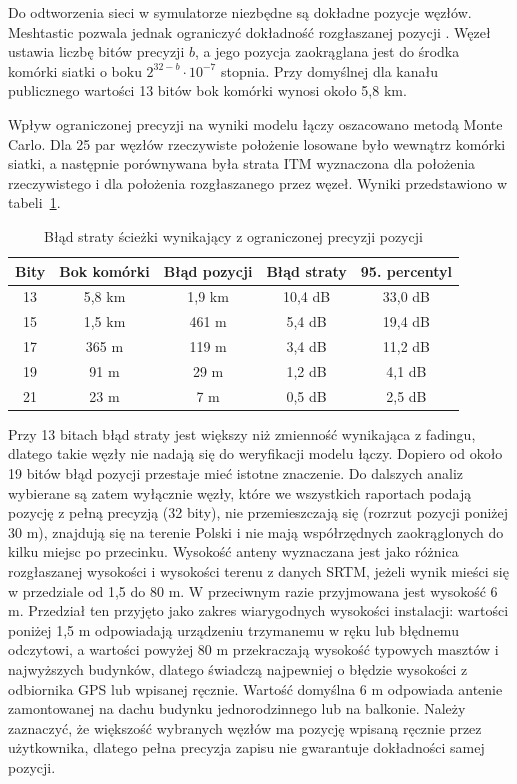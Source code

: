Do odtworzenia sieci w symulatorze niezbędne są dokładne pozycje węzłów. Meshtastic pozwala jednak ograniczyć dokładność rozgłaszanej pozycji \cite{meshtastic_protobufs}. Węzeł ustawia liczbę bitów precyzji \(b\), a jego pozycja zaokrąglana jest do środka komórki siatki o boku \(2^{32-b} \cdot 10^{-7}\) stopnia. Przy domyślnej dla kanału publicznego wartości 13 bitów bok komórki wynosi około 5,8 km.

Wpływ ograniczonej precyzji na wyniki modelu łączy oszacowano metodą Monte Carlo. Dla 25 par węzłów rzeczywiste położenie losowane było wewnątrz komórki siatki, a następnie porównywana była strata ITM wyznaczona dla położenia rzeczywistego i dla położenia rozgłaszanego przez węzeł. Wyniki przedstawiono w tabeli~\ref{tab:precyzja}.

\begin{table}[ht]
\centering
\caption{Błąd straty ścieżki wynikający z ograniczonej precyzji pozycji}
\label{tab:precyzja}
\small
\begin{tabular}{|c|c|c|c|c|}
\hline
\textbf{Bity} & \textbf{Bok komórki} & \textbf{Błąd pozycji} & \textbf{Błąd straty} & \textbf{95. percentyl} \\
\hline
13 & 5,8 km & 1,9 km & 10,4 dB & 33,0 dB \\
15 & 1,5 km & 461 m & 5,4 dB & 19,4 dB \\
17 & 365 m & 119 m & 3,4 dB & 11,2 dB \\
19 & 91 m & 29 m & 1,2 dB & 4,1 dB \\
21 & 23 m & 7 m & 0,5 dB & 2,5 dB \\
\hline
\end{tabular}
\end{table}

Przy 13 bitach błąd straty jest większy niż zmienność wynikająca z fadingu, dlatego takie węzły nie nadają się do weryfikacji modelu łączy. Dopiero od około 19 bitów błąd pozycji przestaje mieć istotne znaczenie. Do dalszych analiz wybierane są zatem wyłącznie węzły, które we wszystkich raportach podają pozycję z pełną precyzją (32 bity), nie przemieszczają się (rozrzut pozycji poniżej 30 m), znajdują się na terenie Polski i nie mają współrzędnych zaokrąglonych do kilku miejsc po przecinku. Wysokość anteny wyznaczana jest jako różnica rozgłaszanej wysokości i wysokości terenu z danych SRTM, jeżeli wynik mieści się w przedziale od 1,5 do 80 m. W przeciwnym razie przyjmowana jest wysokość 6 m. Przedział ten przyjęto jako zakres wiarygodnych wysokości instalacji: wartości poniżej 1,5 m odpowiadają urządzeniu trzymanemu w ręku lub błędnemu odczytowi, a wartości powyżej 80 m przekraczają wysokość typowych masztów i najwyższych budynków, dlatego świadczą najpewniej o błędzie wysokości z odbiornika GPS lub wpisanej ręcznie. Wartość domyślna 6 m odpowiada antenie zamontowanej na dachu budynku jednorodzinnego lub na balkonie. Należy zaznaczyć, że większość wybranych węzłów ma pozycję wpisaną ręcznie przez użytkownika, dlatego pełna precyzja zapisu nie gwarantuje dokładności samej pozycji.

